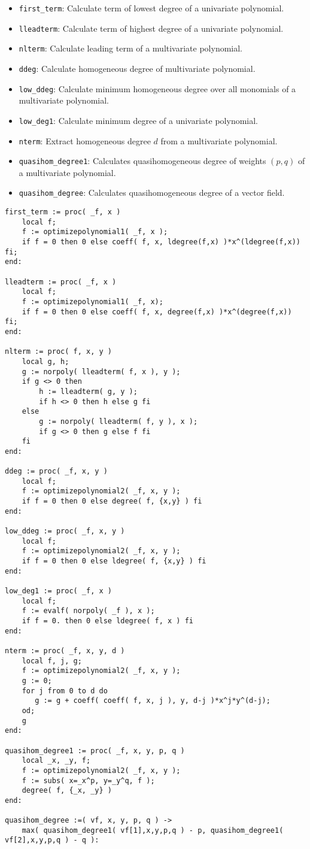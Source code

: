\documentclass[a4paper,10pt]{article}
\begin{document}
\begin{itemize}
\item   \verb+first_term+:   Calculate term of lowest degree of a univariate polynomial.
\item   \verb+lleadterm+:    Calculate term of highest degree of a univariate polynomial.
\item   \verb+nlterm+:       Calculate leading term of a multivariate polynomial.
\item   \verb+ddeg+:         Calculate homogeneous degree of multivariate polynomial.
\item   \verb+low_ddeg+:    Calculate minimum homogeneous degree over all monomials of a multivariate polynomial.
\item   \verb+low_deg1+:     Calculate minimum degree of a univariate polynomial.
\item   \verb+nterm+:       Extract homogeneous degree $d$ from a multivariate polynomial.
\item   \verb+quasihom_degree1+: Calculates quasihomogeneous degree of weights $(p,q)$ of a multivariate polynomial.
\item   \verb+quasihom_degree+: Calculates quasihomogeneous degree of a vector field.
\end{itemize}

\begin{lstlisting}[name=tools]
first_term := proc( _f, x )
    local f;
    f := optimizepolynomial1( _f, x );
    if f = 0 then 0 else coeff( f, x, ldegree(f,x) )*x^(ldegree(f,x)) fi;
end:

lleadterm := proc( _f, x )
    local f;
    f := optimizepolynomial1( _f, x);
    if f = 0 then 0 else coeff( f, x, degree(f,x) )*x^(degree(f,x)) fi;
end:

nlterm := proc( f, x, y )
    local g, h;
    g := norpoly( lleadterm( f, x ), y );
    if g <> 0 then
        h := lleadterm( g, y );
        if h <> 0 then h else g fi
    else
        g := norpoly( lleadterm( f, y ), x );
        if g <> 0 then g else f fi
    fi
end:

ddeg := proc( _f, x, y )
    local f;
    f := optimizepolynomial2( _f, x, y );
    if f = 0 then 0 else degree( f, {x,y} ) fi
end:

low_ddeg := proc( _f, x, y )
    local f;
    f := optimizepolynomial2( _f, x, y );
    if f = 0 then 0 else ldegree( f, {x,y} ) fi
end:

low_deg1 := proc( _f, x )
    local f;
    f := evalf( norpoly( _f ), x );
    if f = 0. then 0 else ldegree( f, x ) fi
end:

nterm := proc( _f, x, y, d )
    local f, j, g;
    f := optimizepolynomial2( _f, x, y );
    g := 0;
    for j from 0 to d do
       g := g + coeff( coeff( f, x, j ), y, d-j )*x^j*y^(d-j);
    od;
    g
end:

quasihom_degree1 := proc( _f, x, y, p, q )
    local _x, _y, f;
    f := optimizepolynomial2( _f, x, y );
    f := subs( x=_x^p, y=_y^q, f );
    degree( f, {_x, _y} )
end:

quasihom_degree :=( vf, x, y, p, q ) ->
    max( quasihom_degree1( vf[1],x,y,p,q ) - p, quasihom_degree1( vf[2],x,y,p,q ) - q ):
\end{lstlisting}
\end{document}

